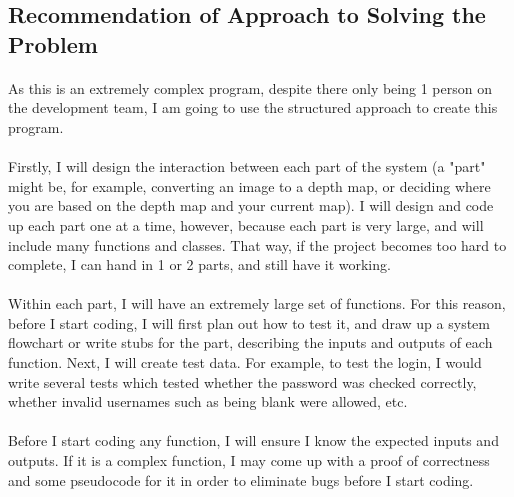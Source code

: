 \subsection{Recommendation of Approach to Solving the Problem}
\paragraph{}
As this is an extremely complex program, despite there only being 1 person on the development team, I am going to use the structured approach to create this program. 

\paragraph{}
Firstly, I will design the interaction between each part of the system (a "part" might be, for example, converting an image to a depth map, or deciding where you are based on the depth map and your current map). I will design and code up each part one at a time, however, because each part is very large, and will include many functions and classes. That way, if the project becomes too hard to complete, I can hand in 1 or 2 parts, and still have it working.

\paragraph{}
Within each part, I will have an extremely large set of functions. For this reason, before I start coding, I will first plan out how to test it, and draw up a system flowchart or write stubs for the part, describing the inputs and outputs of each function. Next, I will create test data. For example, to test the login, I would write several tests which tested whether the password was checked correctly, whether invalid usernames such as being blank were allowed, etc.

\paragraph{}
Before I start coding any function, I will ensure I know the expected inputs and outputs. If it is a complex function, I may come up with a proof of correctness and some pseudocode for it in order to eliminate bugs before I start coding.